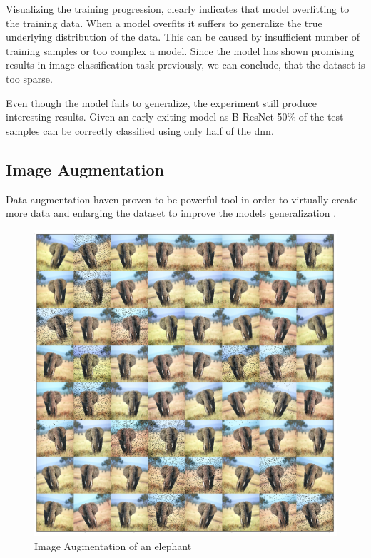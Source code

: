 Visualizing the training progression, clearly indicates that model overfitting to the training data. When a model overfits it suffers to generalize the true underlying distribution of the data. This can be caused by insufficient number of training samples or too complex a model. Since the model has shown promising results in image classification task previously, we can conclude, that the dataset is too sparse.

Even though the model fails to generalize, the experiment still produce interesting results. Given an early exiting model as B-ResNet 50\% of the test samples can be correctly classified using only half of the \gls{dnn}.

\subsection{Image Augmentation}

Data augmentation haven proven to be powerful tool in order to virtually create more data and enlarging the dataset to improve the models generalization \cite{data augmentation}.

\begin{figure}[H]
	\centering
	\includegraphics[width=\linewidth]{figures/augmentation/augmentation_high_resolution.png}
	\caption[Image Augmentaion Example]{Image Augmentation of an elephant}
	\label{fig:augmentation}
\end{figure}

